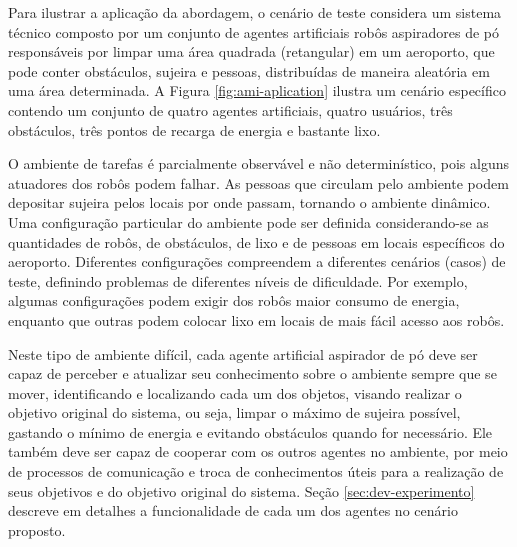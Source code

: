 Para ilustrar a aplicação da abordagem, o cenário de teste considera um sistema técnico composto por um conjunto de agentes artificiais robôs aspiradores de pó responsáveis por limpar uma área quadrada (retangular) em um aeroporto, que pode conter obstáculos, sujeira e pessoas, distribuídas de maneira aleatória em uma área determinada. A Figura \ref{fig:ami-aplication} ilustra um cenário específico contendo um conjunto de quatro agentes artificiais, quatro usuários, três obstáculos, três pontos de recarga de energia e bastante lixo. 

\begin{figure}[h!]
    \centering
\end{figure}

O ambiente de tarefas é parcialmente observável e não determinístico, pois alguns atuadores dos robôs podem falhar. As pessoas que circulam pelo ambiente podem depositar sujeira pelos locais por onde passam, tornando o ambiente dinâmico. Uma configuração particular do ambiente pode ser definida considerando-se as quantidades de robôs, de obstáculos, de lixo e de pessoas em locais específicos do aeroporto. Diferentes configurações compreendem a diferentes cenários (casos) de teste, definindo problemas de diferentes níveis de dificuldade. Por exemplo, algumas configurações podem exigir dos robôs maior consumo de energia, enquanto que outras podem colocar lixo em locais de mais fácil acesso aos robôs. 

Neste tipo de ambiente difícil, cada agente artificial aspirador de pó deve ser capaz de perceber e atualizar seu conhecimento sobre o ambiente sempre que se mover, identificando e localizando cada um dos objetos, visando realizar o objetivo original do sistema, ou seja, limpar o máximo de sujeira possível, gastando o mínimo de energia e evitando obstáculos quando for necessário. Ele também deve ser capaz de cooperar com os outros agentes no ambiente, por meio de processos de comunicação e troca de conhecimentos úteis para a realização de seus objetivos e do objetivo original do sistema. Seção \ref{sec:dev-experimento} descreve em detalhes a funcionalidade de cada um dos agentes no cenário proposto. 



